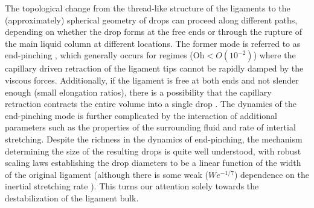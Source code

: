 The topological change from the thread-like structure of the ligaments to the 
(approximately) spherical geometry of drops can proceed along different paths, 
depending on whether the drop forms at the free ends or through the 
rupture of the main liquid column at different locations. 
The former mode is referred to as end-pinching \cite{end_pinch_1,end_pinch_2}, 
which generally occurs for regimes ($\textrm{Oh} < O(10^{-2})$) where the capillary driven
retraction of the ligament tips cannot be rapidly damped by the viscous forces. 
Additionally, if the ligament is free at both ends and not slender enough (small elongation ratios), 
there is a possibility that the capillary retraction contracts the entire volume into a single drop \cite{stone_1}. 
The dynamics of the end-pinching mode is further complicated by the interaction of 
additional parameters such as the properties of the surrounding fluid and rate of intertial stretching. 
Despite the richness in the dynamics of end-pinching, the mechanism determining the size of the resulting
drops is quite well understood, with robust scaling laws establishing the drop diameters to be a linear
function of the width of the original ligament \cite{end_pinch_1} (although there is some weak ($We^{-1/7}$) 
dependence on the inertial stretching rate \cite{end_pinch_3} ).
This turns our attention solely towards the destabilization of the ligament bulk. 


